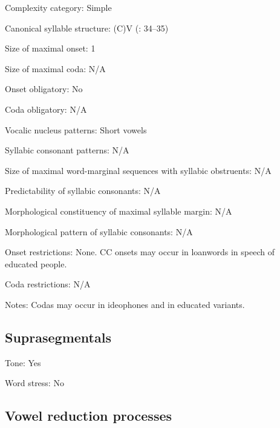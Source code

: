 {\begin{appendixdesc}
\item[Complexity category:] Simple

\item[Canonical syllable structure:] (C)V (\citealt{BlackingsFabb2003}: 34--35)

\item[Size of maximal onset:] 1

\item[Size of maximal coda:] N/A

\item[Onset obligatory:] No

\item[Coda obligatory:] N/A

\item[Vocalic nucleus patterns:] Short vowels

\item[Syllabic consonant patterns:] N/A

\item[Size of maximal word-marginal sequences with syllabic obstruents:] N/A

\item[Predictability of syllabic consonants:] N/A

\item[Morphological constituency of maximal syllable margin:] N/A

\item[Morphological pattern of syllabic consonants:] N/A

\item[Onset restrictions:] None. CC onsets may occur in loanwords in speech of educated people.

\item[Coda restrictions:] N/A

\item[Notes:] Codas may occur in ideophones and in educated variants.
\end{appendixdesc}
\subsection*{Suprasegmentals}
\begin{appendixdesc}
\item[Tone:] Yes

\item[Word stress:] No
\end{appendixdesc}
\subsection*{Vowel reduction processes}

}
